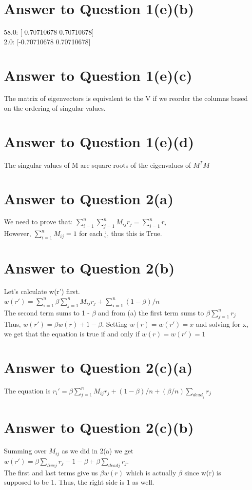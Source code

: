 \documentclass[11pt]{article}
\begin{document}
\section*{Answer to Question 1(e)(b)}
58.0: [ 0.70710678  0.70710678]\\
2.0: [-0.70710678  0.70710678]
\section*{Answer to Question 1(e)(c)}
The matrix of eigenvectors is equivalent to the V if we reorder the columns based on the ordering of singular values.
\section*{Answer to Question 1(e)(d)}
The singular values of M are square roots of the eigenvalues of $M^TM$
\section*{Answer to Question 2(a)}
We need to prove that: 
$\sum_{i=1}^{n}\sum_{j=1}^{n}{M_{ij}r_j} = \sum_{i=1}^{n}{r_i} $ \\
However, $\sum_{i=1}^{n}{M_{ij}} =1  $ for each j, thus this is True.
\section*{Answer to Question 2(b)}
Let's calculate w(r') first. \\
$ w(r') = \sum_{i=1}^{n}\beta \sum_{j=1}^{n}{M_{ij}r_j} + \sum_{i=1}^{n}(1-\beta)/n$ \\
The second term sums to 1 - $\beta$ and from (a) the first term sums to $\beta\sum_{j=1}^{n}r_j $\\
Thus, $w(r') =\beta w(r) +1-\beta $. Setting $ w(r) = w(r')= x$ and solving for x, we get that the equation is true if and only if $ w(r) = w(r')= 1$
\section*{Answer to Question 2(c)(a)}
The equation is $ r_i' = \beta\sum_{j=1}^{n}M_{ij}r_j + (1-\beta)/n + (\beta/n)\sum_{dead_j}r_j $ 
\section*{Answer to Question 2(c)(b)}
Summing over $M_{ij}$ as we did in 2(a) we get $w(r') = \beta \sum_{livej}r_j + 1 - \beta + \beta \sum_{deadj}r_j. $\\
The first and last terms give us $\beta w(r)$ which is actually $\beta$ since w(r) is supposed to be 1. Thus, the right side is 1 as well.
\end{document}
